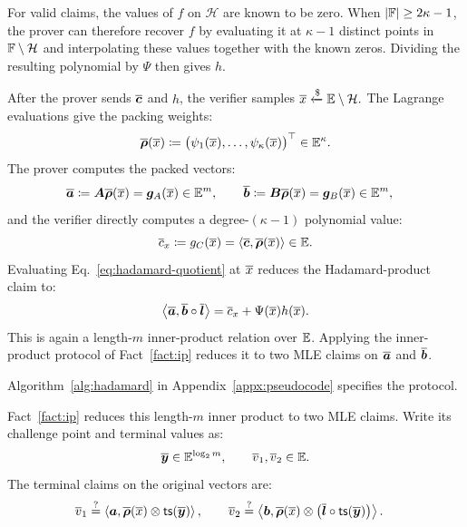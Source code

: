 For valid claims, the values of \(f\) on \(\mathcal H\)
are known to be zero.
When \(|{\mathbb{F}}|\ge 2\kappa-1\), the prover can therefore
recover \(f\) by evaluating it at \(\kappa-1\) distinct
points in \({\mathbb{F}}\setminus\mathcal H\) and interpolating
these values together with the known zeros.
Dividing the resulting polynomial by \(\Psi\) then gives \(h\).

After the prover sends \(\overline{\bm c}\) and \(h\), the verifier
samples
\(
    \overline{x}
    \mathrel{\xleftarrow{\$}}
    \mathbb{E}\setminus\mathcal H.
\)
The Lagrange evaluations give the packing weights:
\[
    \overline{\bm\rho}(\overline{x})
    \coloneqq
    \bigl(
        \psi_1(\overline{x}),\ldots,\psi_\kappa(\overline{x})
    \bigr)^\top \in \mathbb{E}^\kappa.
\]
The prover computes the packed vectors:
\[
\begin{aligned}
    \overline{\bm a}
    &\coloneqq
    \bm A\overline{\bm\rho}(\overline{x})
    =
    \bm g_A(\overline{x}) \in \mathbb{E}^m,
    \qquad
    \overline{\bm b}
    \coloneqq
    \bm B\overline{\bm\rho}(\overline{x})
    =
    \bm g_B(\overline{x})  \in \mathbb{E}^m,
\end{aligned}
\]
and the verifier directly computes a degree-$(\kappa-1)$ polynomial value:
\[
    \overline{c}_x
    \coloneqq
    g_C(\overline{x})
    =
    \left\langle
        \overline{\bm c},
        \overline{\bm\rho}(\overline{x})
    \right\rangle \in \mathbb{E}.
\]
Evaluating Eq.~\eqref{eq:hadamard-quotient} at \(\overline{x}\)
reduces the Hadamard-product claim to:
\begin{equation*}
    \left\langle
        \overline{\bm a},
        \overline{\bm b}\circ\overline{\bm l}
    \right\rangle
    =
    \overline{c}_x
    +
    \Psi(\overline{x})h(\overline{x}).
\end{equation*}
This is again a length-\(m\) inner-product relation over
\(\mathbb{E}\).
Applying the inner-product protocol of Fact~\ref{fact:ip}
reduces it to two MLE claims on
\(\overline{\bm a}\) and \(\overline{\bm b}\).

Algorithm~\ref{alg:hadamard} in Appendix~\ref{appx:pseudocode}
specifies the protocol.

\iffalse
Fact~\ref{fact:ip} reduces this length-\(m\) inner product to two
MLE claims. Write its challenge point and terminal values as:
\[
    \overline{\bm y}\in\mathbb{E}^{\log_2m},
    \qquad
    \overline{v}_1,\overline{v}_2\in\mathbb{E}.
\]
The terminal claims on the original vectors are:
\begin{align}
\label{eq:hadamard-terminal}
    \overline{v}_1
    &\mathrel{\overset{\mathrm{?}}{=}}
    \left\langle
        \bm a,
        \overline{\bm\rho}(\overline{x})
        \mathbin{\otimes}
        {\sf ts}(\overline{\bm y})
    \right\rangle,
    \qquad
    \overline{v}_2
    \mathrel{\overset{\mathrm{?}}{=}}
    \left\langle
        \bm b,
        \overline{\bm\rho}(\overline{x})
        \mathbin{\otimes}
        \left(
            \overline{\bm l}
            \circ
            {\sf ts}(\overline{\bm y})
        \right)
    \right\rangle.
\end{align}

